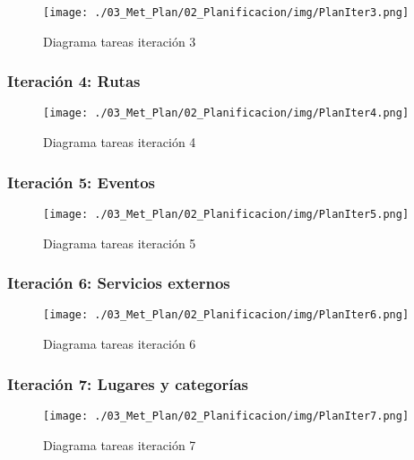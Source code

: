 \begin{figure}[H]
\vspace{-1cm}
\texttt{[image: ./03\_Met\_Plan/02\_Planificacion/img/PlanIter3.png]}
\caption{Diagrama tareas iteración 3}
\end{figure}


\subsubsection*{Iteración 4: Rutas}

\begin{figure}[H]
\vspace{-1cm}
\texttt{[image: ./03\_Met\_Plan/02\_Planificacion/img/PlanIter4.png]}
\caption{Diagrama tareas iteración 4}
\end{figure}



\subsubsection*{Iteración 5: Eventos}

\begin{figure}[H]
\vspace{-1cm}
\texttt{[image: ./03\_Met\_Plan/02\_Planificacion/img/PlanIter5.png]}
\caption{Diagrama tareas iteración 5}
\end{figure}


\subsubsection*{Iteración 6: Servicios externos}

\begin{figure}[H]
\vspace{-1cm}
\texttt{[image: ./03\_Met\_Plan/02\_Planificacion/img/PlanIter6.png]}
\caption{Diagrama tareas iteración 6}
\end{figure}


\subsubsection*{Iteración 7: Lugares y categorías}

\begin{figure}[H]
\vspace{-1cm}
\texttt{[image: ./03\_Met\_Plan/02\_Planificacion/img/PlanIter7.png]}
\caption{Diagrama tareas iteración 7}
\end{figure}


